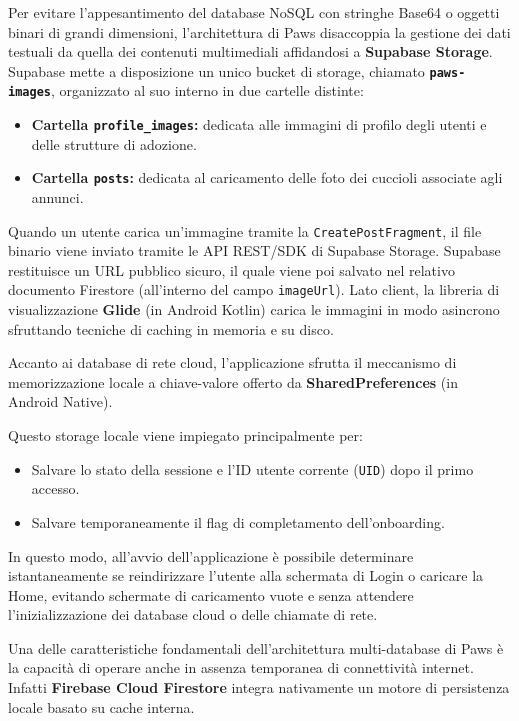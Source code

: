\documentclass[a4paper]{report}
\begin{document}
Per evitare l'appesantimento del database NoSQL con stringhe Base64 o oggetti binari di grandi dimensioni, l'architettura di Paws disaccoppia la gestione dei dati testuali da quella dei contenuti multimediali affidandosi a \textbf{Supabase Storage}.
\noindent Supabase mette a disposizione un unico bucket di storage, chiamato \textbf{\texttt{paws-images}}, organizzato al suo interno in due cartelle distinte:
\begin{itemize}
    \item \textbf{Cartella \texttt{profile\_images}:} dedicata alle immagini di profilo degli utenti e delle strutture di adozione.
    \item \textbf{Cartella \texttt{posts}:} dedicata al caricamento delle foto dei cuccioli associate agli annunci.
\end{itemize}

\noindent Quando un utente carica un'immagine tramite la \texttt{CreatePostFragment}, il file binario viene inviato tramite le API REST/SDK di Supabase Storage. Supabase restituisce un URL pubblico sicuro, il quale viene poi salvato nel relativo documento Firestore (all'interno del campo \texttt{imageUrl}). Lato client, la libreria di visualizzazione \textbf{Glide} (in Android Kotlin) carica le immagini in modo asincrono sfruttando tecniche di caching in memoria e su disco.

Accanto ai database di rete cloud, l'applicazione sfrutta il meccanismo di memorizzazione locale a chiave-valore offerto da \textbf{SharedPreferences} (in Android Native).

\noindent Questo storage locale viene impiegato principalmente per:
\begin{itemize}
    \item Salvare lo stato della sessione e l'ID utente corrente (\texttt{UID}) dopo il primo accesso.
    \item Salvare temporaneamente il flag di completamento dell'onboarding.
\end{itemize}

\noindent In questo modo, all'avvio dell'applicazione è possibile determinare istantaneamente se reindirizzare l'utente alla schermata di Login o caricare la Home, evitando schermate di caricamento vuote e senza attendere l'inizializzazione dei database cloud o delle chiamate di rete.

Una delle caratteristiche fondamentali dell'architettura multi-database di Paws è la capacità di operare anche in assenza temporanea di connettività internet. Infatti \textbf{Firebase Cloud Firestore} integra nativamente un motore di persistenza locale basato su cache interna.
\end{document}
